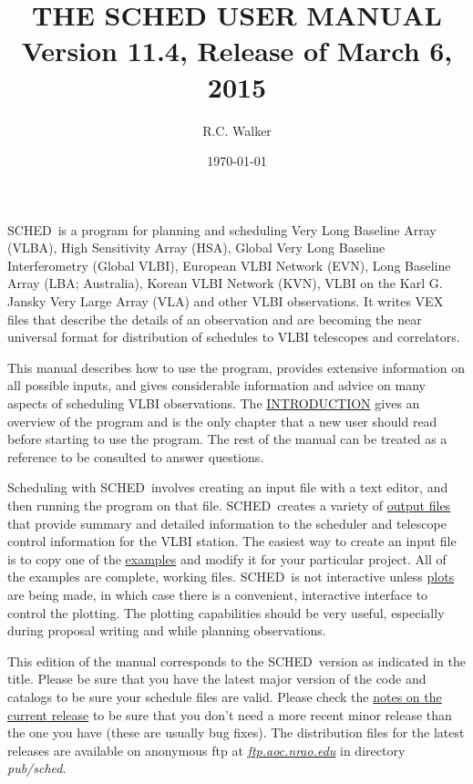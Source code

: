 \documentclass{report}
\newcommand{\schedb}{{\sc SCHED~}}
\begin{document}
\title{THE SCHED USER MANUAL \protect\\ Version 11.4,  Release of March 6, 2015}
\author{R.C. Walker}
\date{\today}
\maketitle


\schedb is a program for planning and scheduling Very Long Baseline
Array (VLBA), High Sensitivity Array (HSA), Global Very Long Baseline
Interferometry (Global VLBI), European VLBI Network (EVN), Long
Baseline Array (LBA; Australia), Korean VLBI Network (KVN), VLBI on
the Karl G. Jansky Very Large Array (VLA) and other VLBI observations.
It writes VEX files that describe the details of an observation and
are becoming the near universal format for distribution of schedules
to VLBI telescopes and correlators.

This manual describes how to use the program, provides extensive
information on all possible inputs, and gives considerable information
and advice on many aspects of scheduling VLBI observations.  The
{\hyperref[CHP:INTRO]{INTRODUCTION}} gives an overview of the program and
is the only chapter that a new user should read before starting to use
the program.  The rest of the manual can be treated as a reference to
be consulted to answer questions.

Scheduling with \schedb involves creating an input file with a text
editor, and then running the program on that file.  \schedb creates a
variety of 
{\hyperref[SEC:FILES]{output files}} that provide summary and
detailed information to the scheduler and telescope control
information for the VLBI station.  The easiest way to create an input
file is to copy one of the 
{\hyperref[SEC:EXAMPLES]{examples}} and
modify it for your particular project.  All of the examples are
complete, working files.  \schedb is not interactive unless
{\hyperref[SEC:PLOT]{plots}} are being made, in which case there is a
convenient, interactive interface to control the plotting.  The
plotting capabilities should be very useful, especially during
proposal writing and while planning observations.

This edition of the manual corresponds to the \schedb version as
indicated in the title.  Please be sure that you have the latest major
version of the code and catalogs to be sure your schedule files are
valid.  Please check the 
{\hyperref[SEC:CURRENT]{notes on the current release}}
to be sure that you don't need a more recent
minor release than the one you have (these are usually bug fixes).
The distribution files for the latest releases are available on
anonymous ftp at 
{\href{ftp://ftp.aoc.nrao.edu/pub/sched}{{\sl ftp.aoc.nrao.edu}}} in directory {\sl pub/sched}.
\end{document}
